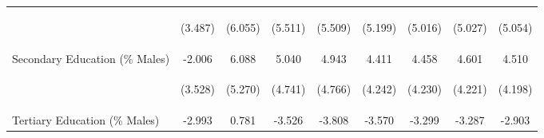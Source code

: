 \begin{landscape}
\begin{table}[htpb!]
\begin{center}
\begin{tabular}{lcccccccc}
&\begin{footnotesize}(3.487)\end{footnotesize}&\begin{footnotesize}(6.055)\end{footnotesize}&\begin{footnotesize}(5.511)\end{footnotesize}&\begin{footnotesize}(5.509)\end{footnotesize}&\begin{footnotesize}(5.199)\end{footnotesize}&\begin{footnotesize}(5.016)\end{footnotesize}&\begin{footnotesize}(5.027)\end{footnotesize}&\begin{footnotesize}(5.054)\end{footnotesize}\\
Secondary Education (\% Males) &-2.006&6.088&5.040&4.943&4.411&4.458&4.601&4.510\\
&\begin{footnotesize}(3.528)\end{footnotesize}&\begin{footnotesize}(5.270)\end{footnotesize}&\begin{footnotesize}(4.741)\end{footnotesize}&\begin{footnotesize}(4.766)\end{footnotesize}&\begin{footnotesize}(4.242)\end{footnotesize}&\begin{footnotesize}(4.230)\end{footnotesize}&\begin{footnotesize}(4.221)\end{footnotesize}&\begin{footnotesize}(4.198)\end{footnotesize}\\
Tertiary Education (\% Males) &-2.993&0.781&-3.526&-3.808&-3.570&-3.299&-3.287&-2.903\\

\end{tabular}
\end{center}
\end{table}
\end{landscape}
